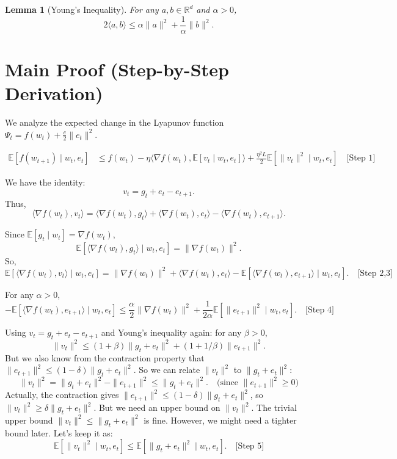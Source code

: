 \documentclass{article}
\newtheorem{lemma}{Lemma}
\begin{document}
\begin{lemma}[Young's Inequality]
For any $a, b \in \mathbb{R}^d$ and $\alpha > 0$,
\[
2\langle a, b \rangle \le \alpha \|a\|^2 + \frac{1}{\alpha} \|b\|^2.
\]
\end{lemma}

\section*{Main Proof (Step-by-Step Derivation)}
We analyze the expected change in the Lyapunov function $\Psi_t = f(w_t) + \frac{c}{2} \|e_t\|^2$.

\begin{align}
\mathbb{E}[f(w_{t+1}) \mid w_t, e_t] 
&\le f(w_t) - \eta \langle \nabla f(w_t), \mathbb{E}[v_t \mid w_t, e_t] \rangle + \frac{\eta^2 L}{2} \mathbb{E}[\|v_t\|^2 \mid w_t, e_t] \quad \text{[Step 1]}
\end{align}

We have the identity:
\[
v_t = g_t + e_t - e_{t+1}.
\]
Thus,
\[
\langle \nabla f(w_t), v_t \rangle = \langle \nabla f(w_t), g_t \rangle + \langle \nabla f(w_t), e_t \rangle - \langle \nabla f(w_t), e_{t+1} \rangle.
\]

Since $\mathbb{E}[g_t \mid w_t] = \nabla f(w_t)$,
\[
\mathbb{E}[\langle \nabla f(w_t), g_t \rangle \mid w_t, e_t] = \|\nabla f(w_t)\|^2.
\]
So,
\[
\mathbb{E}[\langle \nabla f(w_t), v_t \rangle \mid w_t, e_t] = \|\nabla f(w_t)\|^2 + \langle \nabla f(w_t), e_t \rangle - \mathbb{E}[\langle \nabla f(w_t), e_{t+1} \rangle \mid w_t, e_t]. \quad \text{[Step 2,3]}
\]

For any $\alpha > 0$,
\[
- \mathbb{E}[\langle \nabla f(w_t), e_{t+1} \rangle \mid w_t, e_t] \le \frac{\alpha}{2} \|\nabla f(w_t)\|^2 + \frac{1}{2\alpha} \mathbb{E}[\|e_{t+1}\|^2 \mid w_t, e_t]. \quad \text{[Step 4]}
\]

Using $v_t = g_t + e_t - e_{t+1}$ and Young's inequality again: for any $\beta > 0$,
\[
\|v_t\|^2 \le (1+\beta) \|g_t + e_t\|^2 + (1+1/\beta) \|e_{t+1}\|^2.
\]
But we also know from the contraction property that $\|e_{t+1}\|^2 \le (1-\delta) \|g_t + e_t\|^2$. So we can relate $\|v_t\|^2$ to $\|g_t + e_t\|^2$:
\[
\|v_t\|^2 = \|g_t + e_t\|^2 - \|e_{t+1}\|^2 \le \|g_t + e_t\|^2. \quad \text{(since $\|e_{t+1}\|^2 \ge 0$)}
\]
Actually, the contraction gives $\|e_{t+1}\|^2 \le (1-\delta)\|g_t+e_t\|^2$, so $\|v_t\|^2 \ge \delta \|g_t+e_t\|^2$. But we need an upper bound on $\|v_t\|^2$. The trivial upper bound $\|v_t\|^2 \le \|g_t+e_t\|^2$ is fine. However, we might need a tighter bound later. Let's keep it as:
\[
\mathbb{E}[\|v_t\|^2 \mid w_t, e_t] \le \mathbb{E}[\|g_t + e_t\|^2 \mid w_t, e_t]. \quad \text{[Step 5]}
\]
\end{document}
